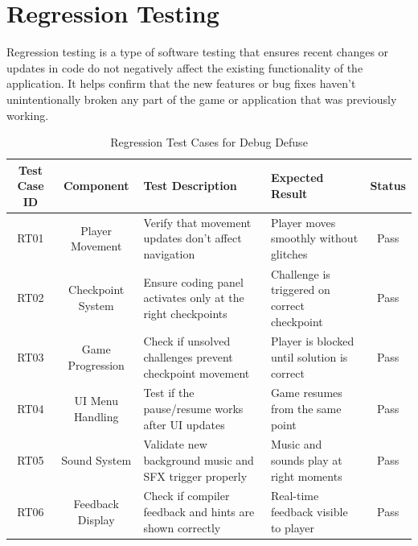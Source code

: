 \section{Regression Testing}
Regression testing is a type of software testing that ensures recent changes or updates in code do not negatively affect the existing functionality of the application. It helps confirm that the new features or bug fixes haven't unintentionally broken any part of the game or application that was previously working.
\begin{table}[H]
    \centering
    \renewcommand{\arraystretch}{1.3}
    \small
    \begin{tabular}{|c|c|p{3cm}|p{3cm}|c|}
        \hline
        \textbf{Test Case ID} & \textbf{Component} & \textbf{Test Description} & \textbf{Expected Result} & \textbf{Status} \\
        \hline
        RT01 & Player Movement & \raggedright Verify that movement updates don’t affect navigation & \raggedright Player moves smoothly without glitches & Pass \\
        \hline
        RT02 & Checkpoint System & \raggedright Ensure coding panel activates only at the right checkpoints & \raggedright Challenge is triggered on correct checkpoint & Pass \\
        \hline
        RT03 & Game Progression & \raggedright Check if unsolved challenges prevent checkpoint movement & \raggedright Player is blocked until solution is correct & Pass \\
        \hline
        RT04 & UI Menu Handling & \raggedright Test if the pause/resume works after UI updates & \raggedright Game resumes from the same point & Pass \\
        \hline
        RT05 & Sound System & \raggedright Validate new background music and SFX trigger properly & \raggedright Music and sounds play at right moments & Pass \\
        \hline
        RT06 & Feedback Display & \raggedright Check if compiler feedback and hints are shown correctly & \raggedright Real-time feedback visible to player & Pass \\
        \hline
    \end{tabular}
    \caption{Regression Test Cases for Debug Defuse}
    \label{tab:regression_tests}
\end{table}
\newpage
